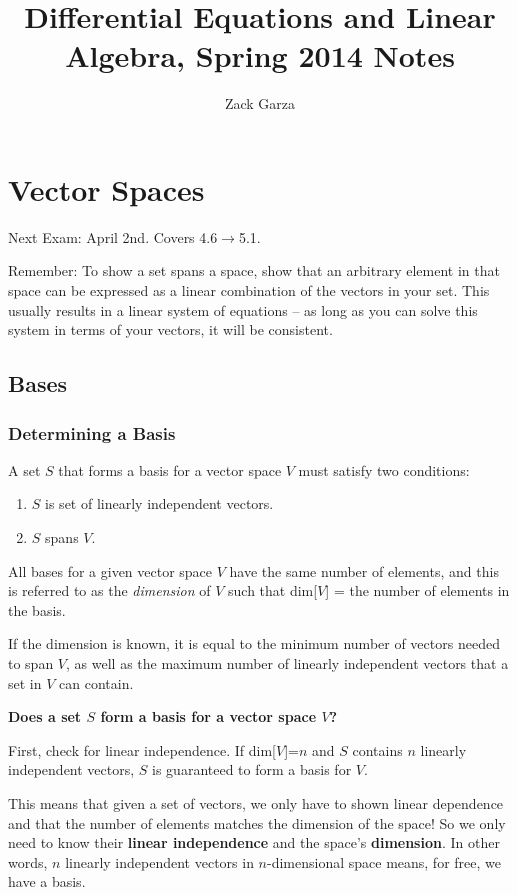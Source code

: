 \documentclass[a4paper,10pt]{report}
\begin{document}
\title{Differential Equations and Linear Algebra, Spring 2014 Notes}
\author{Zack Garza}
\maketitle
\tableofcontents

\chapter{Vector Spaces}
Next Exam: April 2nd. Covers 4.6$\rightarrow$5.1.

Remember: To show a set spans a space, show that an arbitrary element in that space can be expressed as a linear combination of the vectors in your set. This usually results in a linear system of equations -- as long as you can solve this system in terms of your vectors, it will be consistent.

\section{Bases}
\subsection{Determining a Basis}
A set $S$ that forms a basis for a vector space $V$ must satisfy two conditions:
\begin{enumerate}
  \item $S$ is set of linearly independent vectors.
  \item $S$ spans $V$.
\end{enumerate}

All bases for a given vector space $V$ have the same number of elements, and this is referred to as the
\textit{dimension} of $V$ such that dim[$V$] = the number of elements in the basis.

If the dimension is known, it is equal to the minimum number of vectors needed to span $V$, as well as the maximum number of linearly independent vectors that a set in $V$ can contain.

\textbf{Does a set $S$ form a basis for a vector space $V$?}

First, check for linear independence. If dim[$V$]=$n$ and $S$ contains $n$ linearly independent vectors, $S$ is guaranteed to form a basis for $V$.

This means that given a set of vectors, we only have to shown linear dependence and that the number of elements matches the dimension of the space! So we only need to know their \textbf{linear independence} and the space's \textbf{dimension}. In other words, $n$ linearly independent vectors in $n$-dimensional space means, for free, we have a basis.
\end{document}
